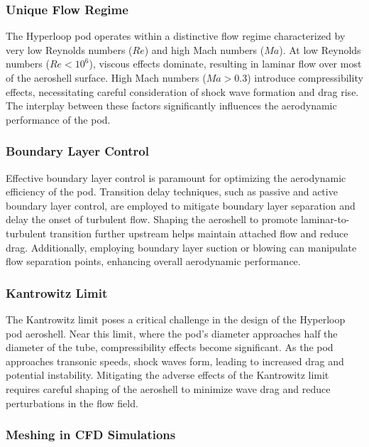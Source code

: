 \subsubsection{Unique Flow Regime}

The Hyperloop pod operates within a distinctive flow regime characterized by very low Reynolds numbers (\(Re\)) and high Mach numbers (\(Ma\)). At low Reynolds numbers (\(Re < 10^6\)), viscous effects dominate, resulting in laminar flow over most of the aeroshell surface. High Mach numbers (\(Ma > 0.3\)) introduce compressibility effects, necessitating careful consideration of shock wave formation and drag rise. The interplay between these factors significantly influences the aerodynamic performance of the pod.

\subsubsection{Boundary Layer Control}

Effective boundary layer control is paramount for optimizing the aerodynamic efficiency of the pod. Transition delay techniques, such as passive and active boundary layer control, are employed to mitigate boundary layer separation and delay the onset of turbulent flow. Shaping the aeroshell to promote laminar-to-turbulent transition further upstream helps maintain attached flow and reduce drag. Additionally, employing boundary layer suction or blowing can manipulate flow separation points, enhancing overall aerodynamic performance.

\subsubsection{Kantrowitz Limit}

The Kantrowitz limit poses a critical challenge in the design of the Hyperloop pod aeroshell. Near this limit, where the pod's diameter approaches half the diameter of the tube, compressibility effects become significant. As the pod approaches transonic speeds, shock waves form, leading to increased drag and potential instability. Mitigating the adverse effects of the Kantrowitz limit requires careful shaping of the aeroshell to minimize wave drag and reduce perturbations in the flow field.



\subsubsection{Meshing in CFD Simulations}

